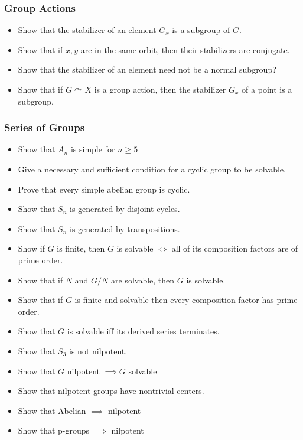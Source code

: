 \hypertarget{group-actions-1}{%
\subsubsection{Group Actions}\label{group-actions-1}}

\begin{itemize}
\tightlist
\item
  Show that the stabilizer of an element \(G_x\) is a subgroup of \(G\).
\item
  Show that if \(x, y\) are in the same orbit, then their stabilizers
  are conjugate.
\item
  Show that the stabilizer of an element need not be a normal subgroup?
\item
  Show that if \(G \curvearrowright X\) is a group action, then the
  stabilizer \(G_x\) of a point is a subgroup.
\end{itemize}

\hypertarget{series-of-groups-1}{%
\subsubsection{Series of Groups}\label{series-of-groups-1}}

\begin{itemize}
\item
  Show that \(A_n\) is simple for \(n\geq 5\)
\item
  Give a necessary and sufficient condition for a cyclic group to be
  solvable.
\item
  Prove that every simple abelian group is cyclic.
\item
  Show that \(S_n\) is generated by disjoint cycles.
\item
  Show that \(S_n\) is generated by transpositions.
\item
  Show if \(G\) is finite, then \(G\) is solvable \(\iff\) all of its
  composition factors are of prime order.
\item
  Show that if \(N\) and \(G/N\) are solvable, then \(G\) is solvable.
\item
  Show that if \(G\) is finite and solvable then every composition
  factor has prime order.
\item
  Show that \(G\) is solvable iff its derived series terminates.
\item
  Show that \(S_3\) is not nilpotent.
\item
  Show that \(G\) nilpotent \(\implies G\) solvable
\item
  Show that nilpotent groups have nontrivial centers.
\item
  Show that Abelian \(\implies\) nilpotent
\item
  Show that p-groups \(\implies\) nilpotent
\end{itemize}

